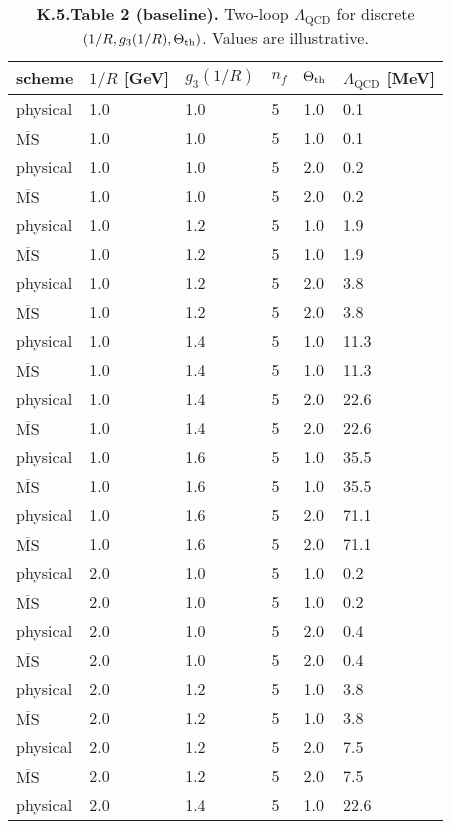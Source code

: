 \begin{table}[h]
\centering
\small
\caption{\textbf{K.5.Table 2 (baseline).} Two-loop $\Lambda_{\mathrm{QCD}}$ for discrete $(1/R, g_3(1/R), \Theta_{\rm th})$. Values are illustrative.}
\begin{tabular}{llllll}
\hline
scheme & $1/R$ [GeV] & $g_3(1/R)$ & $n_f$ & $\Theta_{\rm th}$ & $\Lambda_{\mathrm{QCD}}$ [MeV] \\
\hline
physical & 1.0 & 1.0 & 5 & 1.0 & 0.1\\
$\overline{\mathrm{MS}}$ & 1.0 & 1.0 & 5 & 1.0 & 0.1\\
physical & 1.0 & 1.0 & 5 & 2.0 & 0.2\\
$\overline{\mathrm{MS}}$ & 1.0 & 1.0 & 5 & 2.0 & 0.2\\
physical & 1.0 & 1.2 & 5 & 1.0 & 1.9\\
$\overline{\mathrm{MS}}$ & 1.0 & 1.2 & 5 & 1.0 & 1.9\\
physical & 1.0 & 1.2 & 5 & 2.0 & 3.8\\
$\overline{\mathrm{MS}}$ & 1.0 & 1.2 & 5 & 2.0 & 3.8\\
physical & 1.0 & 1.4 & 5 & 1.0 & 11.3\\
$\overline{\mathrm{MS}}$ & 1.0 & 1.4 & 5 & 1.0 & 11.3\\
physical & 1.0 & 1.4 & 5 & 2.0 & 22.6\\
$\overline{\mathrm{MS}}$ & 1.0 & 1.4 & 5 & 2.0 & 22.6\\
physical & 1.0 & 1.6 & 5 & 1.0 & 35.5\\
$\overline{\mathrm{MS}}$ & 1.0 & 1.6 & 5 & 1.0 & 35.5\\
physical & 1.0 & 1.6 & 5 & 2.0 & 71.1\\
$\overline{\mathrm{MS}}$ & 1.0 & 1.6 & 5 & 2.0 & 71.1\\
physical & 2.0 & 1.0 & 5 & 1.0 & 0.2\\
$\overline{\mathrm{MS}}$ & 2.0 & 1.0 & 5 & 1.0 & 0.2\\
physical & 2.0 & 1.0 & 5 & 2.0 & 0.4\\
$\overline{\mathrm{MS}}$ & 2.0 & 1.0 & 5 & 2.0 & 0.4\\
physical & 2.0 & 1.2 & 5 & 1.0 & 3.8\\
$\overline{\mathrm{MS}}$ & 2.0 & 1.2 & 5 & 1.0 & 3.8\\
physical & 2.0 & 1.2 & 5 & 2.0 & 7.5\\
$\overline{\mathrm{MS}}$ & 2.0 & 1.2 & 5 & 2.0 & 7.5\\
physical & 2.0 & 1.4 & 5 & 1.0 & 22.6\\

\end{tabular}
\end{table}
